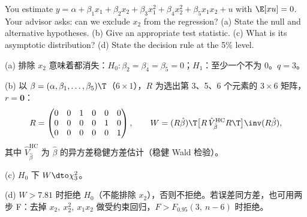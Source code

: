 \begin{prac}\label{pr:U06b-excl}
You estimate $y=\alpha+\beta_1x_1+\beta_2x_2+\beta_3x_1^2+\beta_4x_2^2+\beta_5x_1x_2+u$ with $\E[xu]=0$. Your advisor asks: can we exclude $x_2$ from the regression? (a) State the null and alternative hypotheses. (b) Give an appropriate test statistic. (c) What is its asymptotic distribution? (d) State the decision rule at the 5\% level.

\answer
(a) 排除 $x_2$ 意味着都消失：$H_0:\beta_2=\beta_4=\beta_5=0$；$H_1$：至少一个不为 0。$q=3$。

(b) 以 $\beta=(\alpha,\beta_1,\dots,\beta_5)\T$（$6\times1$），$R$ 为选出第 3、5、6 个元素的 $3\times6$ 矩阵，$r=\mathbf 0$：
\[
R=\begin{pmatrix}0&0&1&0&0&0\\0&0&0&0&1&0\\0&0&0&0&0&1\end{pmatrix},\qquad
W=(R\hat\beta)\T\bigl[R\,\hat V^{\mathrm{HC}}_{\hat\beta}R\T\bigr]\inv(R\hat\beta),
\]
其中 $\hat V^{\mathrm{HC}}_{\hat\beta}$ 为 $\hat\beta$ 的异方差稳健方差估计（稳健 Wald 检验）。

(c) $H_0$ 下 $W\dto\chi^2_3$。

(d) $W>7.81$ 时拒绝 $H_0$（不能排除 $x_2$），否则不拒绝。若误差同方差，也可用两步 F：去掉 $x_2,\ x_2^2,\ x_1x_2$ 做受约束回归，$F>F_{0.95}(3,\ n-6)$ 时拒绝。
\end{prac}

